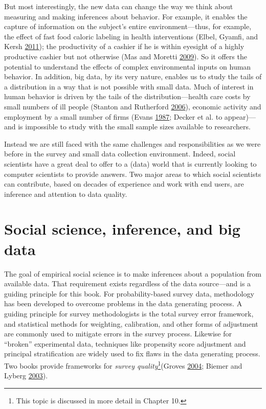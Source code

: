 \documentclass[]{krantz}
\begin{document}
But most interestingly, the new data can change the way we think about
measuring and making inferences about behavior. For example, it enables
the capture of information on the subject's entire environment---thus,
for example, the effect of fast food caloric labeling in health
interventions (Elbel, Gyamfi, and Kersh
\protect\hyperlink{ref-Elbel2011}{2011}); the productivity of a cashier
if he is within eyesight of a highly productive cashier but not
otherwise (Mas and Moretti \protect\hyperlink{ref-Mas2009}{2009}). So it
offers the potential to understand the effects of complex environmental
inputs on human behavior. In addition, big data, by its very nature,
enables us to study the tails of a distribution in a way that is not
possible with small data. Much of interest in human behavior is driven
by the tails of the distribution---health care costs by small numbers of
ill people (Stanton and Rutherford
\protect\hyperlink{ref-stanton2006high}{2006}), economic activity and
employment by a small number of firms (Evans
\protect\hyperlink{ref-evans1987tests}{1987}; Decker et al. to
appear)---and is impossible to study with the small sample sizes
available to researchers.

Instead we are still faced with the same challenges and responsibilities
as we were before in the survey and small data collection environment.
Indeed, social scientists have a great deal to offer to a (data) world
that is currently looking to computer scientists to provide answers. Two
major areas to which social scientists can contribute, based on decades
of experience and work with end users, are inference and attention to
data quality.

\section{Social science, inference, and big data}\label{sec:1.3}

The goal of empirical social science is to make inferences about a
population from available data. That requirement exists regardless of
the data source---and is a guiding principle for this book. For
probability-based survey data, methodology has been developed to
overcome problems in the data generating process. A guiding principle
for survey methodologists is the total survey error framework, and
statistical methods for weighting, calibration, and other forms of
adjustment are commonly used to mitigate errors in the survey process.
Likewise for ``broken'' experimental data, techniques like propensity
score adjustment and principal stratification are widely used to fix
flaws in the data generating process. Two books provide frameworks for
\emph{survey quality}\footnote{This topic is discussed in more detail in
  Chapter 10.}(Groves \protect\hyperlink{ref-groves2004survey}{2004};
Biemer and Lyberg \protect\hyperlink{ref-biemer2003}{2003}).
\end{document}
